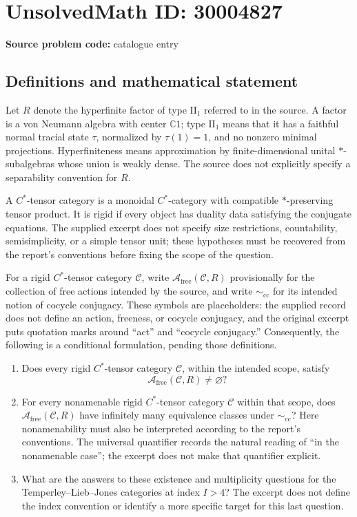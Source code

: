 \documentclass[11pt]{article}
\newcommand{\C}{\mathbb{C}}
\begin{document}
\section*{UnsolvedMath ID: 30004827}
\textbf{Source problem code:} catalogue entry
\subsection{Definitions and mathematical statement}
Let \(R\) denote the hyperfinite factor of type \(\mathrm{II}_1\) referred to in the source. A factor is a von Neumann algebra with center \(\C 1\); type \(\mathrm{II}_1\) means that it has a faithful normal tracial state \(\tau\), normalized by \(\tau(1)=1\), and no nonzero minimal projections. Hyperfiniteness means approximation by finite-dimensional unital \(*\)-subalgebras whose union is weakly dense. The source does not explicitly specify a separability convention for \(R\).

A \(C^*\)-tensor category is a monoidal \(C^*\)-category with compatible \(*\)-preserving tensor product. It is rigid if every object has duality data satisfying the conjugate equations. The supplied excerpt does not specify size restrictions, countability, semisimplicity, or a simple tensor unit; these hypotheses must be recovered from the report's conventions before fixing the scope of the question.

For a rigid \(C^*\)-tensor category \(\mathcal C\), write \(\mathscr A_{\mathrm{free}}(\mathcal C,R)\) provisionally for the collection of free actions intended by the source, and write \(\sim_{\mathrm{cc}}\) for its intended notion of cocycle conjugacy. These symbols are placeholders: the supplied record does not define an action, freeness, or cocycle conjugacy, and the original excerpt puts quotation marks around ``act'' and ``cocycle conjugacy.'' Consequently, the following is a conditional formulation, pending those definitions.

\begin{enumerate}
\item Does every rigid \(C^*\)-tensor category \(\mathcal C\), within the intended scope, satisfy
\[
\mathscr A_{\mathrm{free}}(\mathcal C,R)\ne\varnothing?
\]
\item For every nonamenable rigid \(C^*\)-tensor category \(\mathcal C\) within that scope, does \(\mathscr A_{\mathrm{free}}(\mathcal C,R)\) have infinitely many equivalence classes under \(\sim_{\mathrm{cc}}\)? Here nonamenability must also be interpreted according to the report's conventions. The universal quantifier records the natural reading of ``in the nonamenable case''; the excerpt does not make that quantifier explicit.
\item What are the answers to these existence and multiplicity questions for the Temperley--Lieb--Jones categories at index \(I>4\)? The excerpt does not define the index convention or identify a more specific target for this last question.
\end{enumerate}
\end{document}
